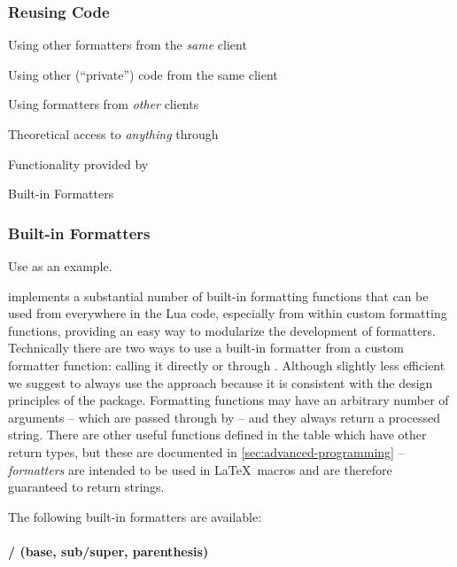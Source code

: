 \documentclass{scrartcl}
\begin{document}
\subsubsection{Reusing Code}
\label{sec:reusing-code}

\begin{itemize*}
\item Using other formatters from the \emph{same} client
\item Using other (“private”) code from the same client
\item Using formatters from \emph{other} clients
\item Theoretical access to \emph{anything} through 
\item Functionality provided by 
\label{sec:builtin-functions}
\item Built-in Formatters
\end{itemize*}




\subsubsection{Built-in Formatters}
\label{sec:builtin-formatters}

Use
as an example.

 implements a substantial number of built-in formatting
functions that can be used from everywhere in the Lua code, especially from
within custom formatting functions, providing an easy way to modularize the
development of formatters.  Technically there are two ways to use a built-in
formatter from a custom formatter function: calling it directly or through
.  Although slightly less efficient we suggest to always
use the  approach because it is consistent with the design
principles of the package.  Formatting functions may have an arbitrary number of
arguments -- which are passed through by  -- and they always
return a processed string.  There are other useful functions defined in the
 table which have other return types, but these are documented
in \vref{sec:advanced-programming} -- \emph{formatters} are intended to be used
in \LaTeX\ macros and are therefore guaranteed to return strings.

\medskip

\noindent
The following built-in formatters are available:

\paragraph{ /  (base, sub/super, parenthesis)}
\end{document}
